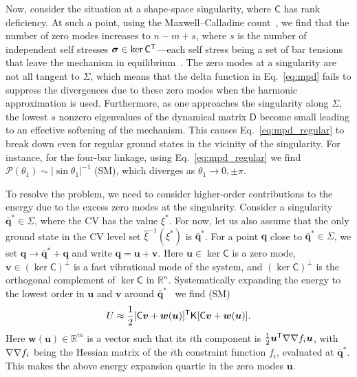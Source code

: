 Now, consider the situation at a shape-space singularity, where $\mathsf{C}$ has rank deficiency.
At such a point, using the Maxwell--Calladine count~\cite{maxwell1864,calladine1978}, we find that the number of zero modes increases to $n - m + s$, where $s$ is the number of independent self stresses $\bm{\sigma} \in \ker\mathsf{C}^\mathsf{T}$---each self stress being a set of bar tensions that leave the mechanism in equilibrium~\cite{lubensky2015}.
The zero modes at a singularity are not all tangent to $\Sigma$, which means that the delta function in Eq.~\eqref{eq:mpd} fails to suppress the divergences due to these zero modes when the harmonic approximation is used.
Furthermore, as one approaches the singularity along $\Sigma$, the lowest $s$ nonzero eigenvalues of the dynamical matrix $\mathsf{D}$ become small leading to an effective softening of the mechanism.
This causes Eq.~\eqref{eq:mpd_regular} to break down even for regular ground states in the vicinity of the singularity.
For instance, for the four-bar linkage, using Eq.~\eqref{eq:mpd_regular} we find $\mathscr{P}(\theta_1) \sim |\sin \theta_1|^{-1}$ (SM), which diverges as $\theta_{1} \to 0, \pm\pi$.

To resolve the problem, we need to consider higher-order contributions to the energy due to the excess zero modes at the singularity.
Consider a singularity $\bar{\bm{q}}^{*} \in \Sigma$, where the CV has the value $\xi^{*}$.
For now, let us also assume that the only ground state in the CV level set $\hat{\xi}^{-1}(\xi^{*})$ is $\bar{\bm{q}}^{*}$.
For a point $\bm{q}$ close to $\bar{\bm{q}}^{*} \in \Sigma$, we set $\bm{q} \to \bar{\bm{q}}^{*} + \bm{q}$ and  write $\bm{q} = \bm{u} + \bm{v}$.
Here $\bm{u} \in \ker\mathsf{C}$ is a zero mode, $\bm{v} \in (\ker\mathsf{C})^{\perp}$ is a fast vibrational mode of the system, and $(\ker\mathsf{C})^{\perp}$ is the orthogonal complement of $\ker\mathsf{C}$ in $\mathbb{R}^{n}$.
Systematically expanding the energy to the lowest order in $\bm{u}$ and $\bm{v}$ around $\bar{\bm{q}}^{*}$~\cite{zhang2016,kallus2017,woodhouse2018} we find (SM)
%
\begin{equation}
  U \approx \frac{1}{2}[\mathsf{C}\bm{v} + \bm{w}(\bm{u})]^\mathsf{T}\mathsf{K}[\mathsf{C}\bm{v} + \bm{w}(\bm{u})].
  \label{eq:energy_singular}
\end{equation}
%
Here $\bm{w}(\bm{u}) \in \mathbb{R}^{m}$ is a vector such that its $i$th component is $\frac{1}{2}\bm{u}^\mathsf{T}\nabla\nabla f_{i}\bm{u}$, with $\nabla\nabla f_{i}$ being the Hessian matrix of the $i$th constraint function $f_{i}$, evaluated at $\bar{\bm{q}}^{*}$.
This makes the above energy expansion quartic in the zero modes $\bm{u}$.

